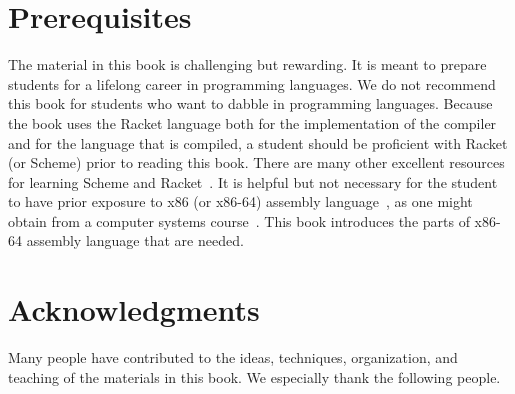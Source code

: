 \documentclass[11pt]{book}
\begin{document}
\section*{Prerequisites}

The material in this book is challenging but rewarding. It is meant to
prepare students for a lifelong career in programming languages.  We do
not recommend this book for students who want to dabble in programming
languages.  Because the book uses the Racket language both for the
implementation of the compiler and for the language that is compiled,
a student should be proficient with Racket (or Scheme) prior to
reading this book. There are many other excellent resources for
learning Scheme and
Racket~\citep{Dybvig:1987aa,Abelson:1996uq,Friedman:1996aa,Felleisen:2001aa,Felleisen:2013aa,Flatt:2014aa}. It
is helpful but not necessary for the student to have prior exposure to
x86 (or x86-64) assembly language~\citep{Intel:2015aa}, as one might
obtain from a computer systems
course~\citep{Bryant:2005aa,Bryant:2010aa}.  This book introduces the
parts of x86-64 assembly language that are needed.



\section*{Acknowledgments}

Many people have contributed to the ideas, techniques, organization,
and teaching of the materials in this book. We especially thank the
following people.
\end{document}
